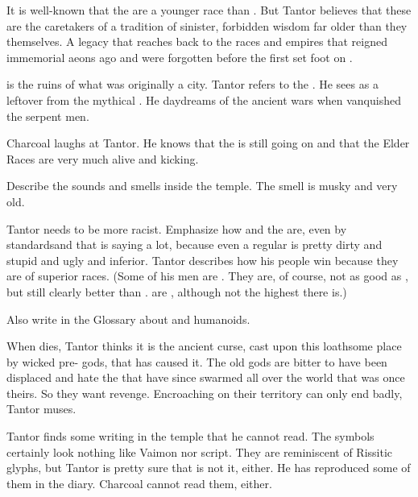 \begin{garbage}
\begin{changes}
    It is well-known that the \meccara{} are a younger race than \humans. 
    But Tantor believes that these \EreshKali{} are the caretakers of a tradition of sinister, forbidden wisdom far older than they themselves. 
    A legacy that reaches back to the races and empires that reigned immemorial aeons ago and were forgotten before the first \humans{} set foot on \Miith. 
    
    \EreshKal{} is the ruins of what was originally a \quiljaaran{} city. 
    Tantor refers to the . 
    He sees \EreshKal{} as a leftover from the mythical . 
    He daydreams of the ancient wars when \humans{} vanquished the serpent men. 
    
    Charcoal laughs at Tantor. 
    He knows that the  is still going on and that the Elder Races are very much alive and kicking. 
  
    Describe the sounds and smells inside the \EreshKali{} temple. 
    The smell is musky and very old. 
    
    Tantor needs to be more racist. 
    Emphasize how  and  the \EreshKali{} are, even by \meccaran{} standards\dash and that is saying a lot, because even a regular \meccaran{} is pretty dirty and stupid and ugly and inferior. 
    Tantor describes how his people win because they are of superior races. 
    (Some of his men are \scathae. 
     They are, of course, not as good as \humans, but still clearly better than \meccara.
     \Scathae{} are , although not the highest there is.)
    
    Also write in the Glossary about  and  humanoids. 
    
    When \Mycah{} dies, Tantor thinks it is the ancient curse, cast upon this loathsome place by wicked pre-\human{} gods, that has caused it. 
    The old gods are bitter to have been displaced and hate the \humans{} that have since swarmed all over the world that was once theirs. 
    So they want revenge. 
    Encroaching on their territory can only end badly, Tantor muses. 
    
    Tantor finds some writing in the temple that he cannot read. 
    The symbols certainly look nothing like Vaimon nor \Ortaican{} script. 
    They are reminiscent of Rissitic glyphs, but Tantor is pretty sure that is not it, either. 
    He has reproduced some of them in the diary. 
    Charcoal cannot read them, either. 
    

\end{changes}
\end{garbage}
